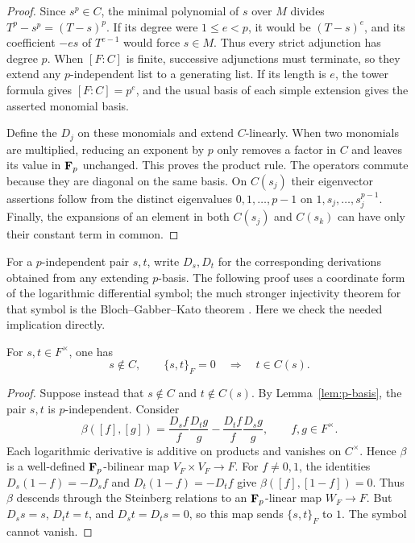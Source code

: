 \begin{proof}
Since $s^p\in C$, the minimal polynomial of $s$ over $M$ divides
$T^p-s^p=(T-s)^p$.  If its degree were $1\leq e<p$, it would be
$(T-s)^e$, and its coefficient $-es$ of $T^{e-1}$ would force $s\in M$.
Thus every strict adjunction has degree $p$.  When $[F:C]$ is finite,
successive adjunctions must terminate, so they extend any
$p$-independent list to a generating list.  If its length is $e$, the
tower formula gives $[F:C]=p^e$, and the usual basis of each simple
extension gives the asserted monomial basis.

Define the $D_j$ on these monomials and extend $C$-linearly.  When two
monomials are multiplied, reducing an exponent by $p$ only removes a
factor in $C$ and leaves its value in $\mathbf F_p$ unchanged.  This proves the
product rule.  The operators commute because they are diagonal on the
same basis.  On $C(s_j)$ their eigenvector assertions follow from the
distinct eigenvalues $0,1,\ldots,p-1$ on $1,s_j,\ldots,s_j^{p-1}$.
Finally, the expansions of an element in both $C(s_j)$ and $C(s_k)$
can have only their constant term in common.
\end{proof}

For a $p$-independent pair $s,t$, write $D_s,D_t$ for the corresponding
derivations obtained from any extending $p$-basis.  The following proof
uses a coordinate form of the logarithmic differential symbol;
the much stronger injectivity theorem for that symbol is the
Bloch--Gabber--Kato theorem \citep[Theorem~(2.1)]{BlochKato1986}.
Here we check the needed implication directly.

\begin{lemma}\label{lem:zero-symbol}
For $s,t\in F^\times$, one has
\[
 s\notin C,\qquad \{s,t\}_F=0
 \quad\Longrightarrow\quad t\in C(s).
\]
\end{lemma}

\begin{proof}
Suppose instead that $s\notin C$ and $t\notin C(s)$.  By
Lemma~\ref{lem:p-basis}, the pair $s,t$ is $p$-independent.  Consider
\[
 \beta([f],[g])=
 \frac{D_s f}{f}\frac{D_t g}{g}
 -\frac{D_t f}{f}\frac{D_s g}{g},
 \qquad f,g\in F^\times.
\]
Each logarithmic derivative is additive on products and vanishes on
$C^\times$.  Hence $\beta$ is a well-defined $\mathbf F_p$-bilinear map
$V_F\times V_F\to F$.  For $f\ne0,1$, the identities
$D_s(1-f)=-D_s f$ and $D_t(1-f)=-D_t f$ give
$\beta([f],[1-f])=0$.  Thus $\beta$ descends through the Steinberg
relations to an $\mathbf F_p$-linear map $W_F\to F$.
But $D_s s=s$, $D_t t=t$, and $D_s t=D_t s=0$, so this map sends
$\{s,t\}_F$ to $1$.  The symbol cannot vanish.
\end{proof}

